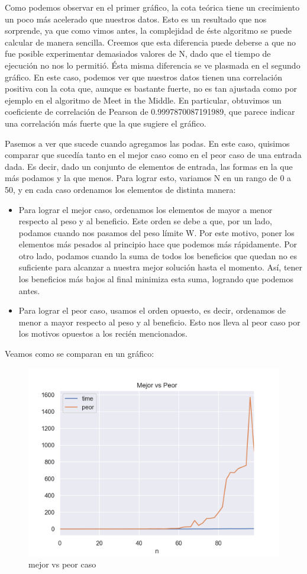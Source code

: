 Como podemos observar en el primer gráfico, la cota teórica tiene un crecimiento un poco más acelerado que nuestros datos. Esto es un resultado que nos sorprende, ya que como vimos antes, la complejidad de éste algoritmo se puede calcular de manera sencilla. Creemos que esta diferencia puede deberse a que no fue posible experimentar demasiados valores de N, dado que el tiempo de ejecución no nos lo permitió.
\newline
Ésta misma diferencia se ve plasmada en el segundo gráfico. En este caso, podemos ver que nuestros datos tienen una correlación positiva con la cota que, aunque es bastante fuerte, no es tan ajustada como por ejemplo en el algoritmo de Meet in the Middle. En particular, obtuvimos un coeficiente de correlación de Pearson de 0.9997870087191989, que parece indicar una correlación más fuerte que la que sugiere el gráfico.

\bigskip

Pasemos a ver que sucede cuando agregamos las podas. En este caso, quisimos comparar que sucedía tanto en el mejor caso como en el peor caso de una entrada dada. Es decir, dado un conjunto de elementos de entrada, las formas en la que más podamos y la que menos. Para lograr esto, variamos N en un rango de 0 a 50, y en cada caso ordenamos los elementos de distinta manera:
\begin{itemize}
\item Para lograr el mejor caso, ordenamos los elementos de mayor a menor respecto al peso y al beneficio. Este orden se debe a que, por un lado, podamos cuando nos pasamos del peso límite W. Por este motivo, poner los elementos más pesados al principio hace que podemos más rápidamente. Por otro lado, podamos cuando la suma de todos los beneficios que quedan no es suficiente para alcanzar a nuestra mejor solución hasta el momento. Así, tener los beneficios más bajos al final minimiza esta suma, logrando que podemos antes.
\item Para lograr el peor caso, usamos el orden opuesto, es decir, ordenamos de menor a mayor respecto al peso y al beneficio. Esto nos lleva al peor caso por los motivos opuestos a los recién mencionados.
\end{itemize}

Veamos como se comparan en un gráfico:


\begin{figure}[H]
     \centering
     \includegraphics[width=0.7\linewidth]{img/mejor_peor_1}
     \caption{mejor vs peor caso}
\end{figure}

